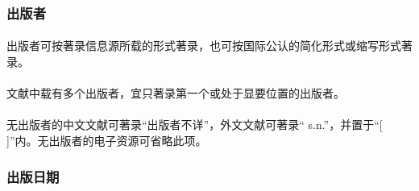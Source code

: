 \documentclass[twoside]{article}%
\begin{document}
\begin{refsection}
\toggletrue{bbx:gbpub}
\nocite{egbookpubaddresse--}
\nocite{egbookpubaddressf--}
\nocite{egbookpubaddressg--}

{}
\end{refsection}


\subsubsection{出版者}

\paragraph{}\label{sec:pub:short} 出版者可按著录信息源所载的形式著录，也可按国际公认的简化形式或缩写形式著录。

\begin{refsection}
\nocite{egbookpubpublishera--}
\nocite{egbookpubpublisherb--}
\nocite{egbookpubpublisherc--}

{}
\end{refsection}

\paragraph{} 文献中载有多个出版者，宜只著录第一个或处于显要位置的出版者。


\begin{refsection}
\nocite{egbookpubpublisherd--}

{}
\end{refsection}

\paragraph{}\label{sec:pub:no-author} 无出版者的中文文献可著录“出版者不详”，外文文献可著录“ s.n.”，并置于“[ ]”内。无出版者的电子资源可省略此项。

\begin{refsection}
\toggletrue{bbx:gbpub}
\nocite{egbookpubpublishere--}
\nocite{egbookpubpublisherf--}

{}
\end{refsection}



\subsubsection{出版日期}
\end{document}
